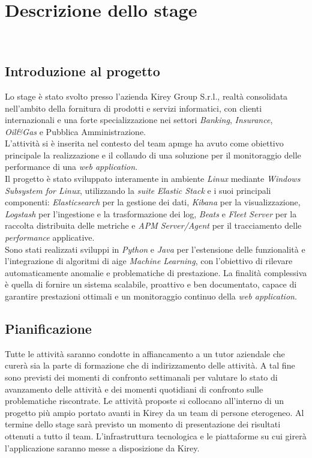\chapter{Descrizione dello stage}
\label{cap:descrizione-stage}

\\

\section{Introduzione al progetto}
Lo stage è stato svolto presso l'azienda Kirey Group S.r.l., realtà consolidata nell'ambito della fornitura di prodotti e servizi informatici, con clienti internazionali e una forte specializzazione nei settori \emph{Banking}, \emph{Insurance}, \emph{Oil\&Gas} e Pubblica Amministrazione. \\ 
L'attività si è inserita nel contesto del team \gls{apmg}\glsfirstoccur e ha avuto come obiettivo principale la realizzazione e il collaudo di una soluzione per il monitoraggio delle performance di una \emph{web application}. \\
Il progetto è stato sviluppato interamente in ambiente \emph{Linux} mediante \emph{Windows Subsystem for Linux}, utilizzando la \emph{suite} \emph{Elastic Stack} e i suoi principali componenti: \emph{Elasticsearch} per la gestione dei dati, \emph{Kibana} per la visualizzazione, \emph{Logstash} per l'ingestione e la trasformazione dei log, \emph{Beats} e \emph{Fleet Server} per la raccolta distribuita delle metriche e \emph{APM Server/Agent} per il tracciamento delle \emph{performance} applicative. \\ 
Sono stati realizzati sviluppi in \emph{Python} e \emph{Java} per l'estensione delle funzionalità e l'integrazione di algoritmi di \gls{aig}\glsfirstoccur e \emph{Machine Learning}, con l'obiettivo di rilevare automaticamente anomalie e problematiche di prestazione.  
La finalità complessiva è quella di fornire un sistema scalabile, proattivo e ben documentato, capace di garantire prestazioni ottimali e un monitoraggio continuo della \emph{web application}.  


\section{Pianificazione}
Tutte le attività saranno condotte in affiancamento a un tutor aziendale che curerà sia la parte di formazione che di indirizzamento delle attività.
A tal fine sono previsti dei momenti di confronto settimanali per valutare lo stato di avanzamento delle attività e dei momenti quotidiani di confronto sulle problematiche riscontrate.
Le attività proposte si collocano all'interno di un progetto più ampio portato avanti in Kirey da un team di persone eterogeneo.
Al termine dello stage sarà previsto un momento di presentazione dei risultati ottenuti a tutto il team.
L'infrastruttura tecnologica e le piattaforme su cui girerà l'applicazione saranno messe a disposizione da Kirey.


